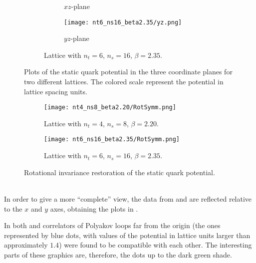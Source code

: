 \begin{figure}[!htbp]
\begin{subfigure}[b]{\textwidth}
\begin{subfigure}[b]{0.32\textwidth}
            \caption{$xz$-plane}
            \label{4F:PotentialPlanes616xz}
        \end{subfigure}
        \hfill
        \begin{subfigure}[b]{0.32\textwidth}
            \addtocounter{subfigure}{-1}
            \renewcommand\thesubfigure{\alph{subfigure}3}
            \texttt{[image: nt6\_ns16\_beta2.35/yz.png]}
            \caption{$yz$-plane}
            \label{4F:PotentialPlanes616yz}
        \end{subfigure}
        \addtocounter{subfigure}{-1}
        \caption{Lattice with $n_t=6$, $n_s=16$, $\beta=2.35$.}
        \label{4F:PotentialPlanes616}
    \end{subfigure}
    \caption{Plots of the static quark potential in the three coordinate planes for two different lattices. The colored scale represent the potential in lattice spacing units.}
    \label{4F:PotentialPlanes}
\end{figure}
\begin{figure}[!htbp]
    \centering
    \begin{subfigure}[b]{0.48\textwidth}
        \texttt{[image: nt4\_ns8\_beta2.20/RotSymm.png]}
        \caption{Lattice with $n_t=4$, $n_s=8$, $\beta=2.20$.}
        \label{4F:PotentialRestorationLargea}
    \end{subfigure}
    \begin{subfigure}[b]{0.48\textwidth}
        \texttt{[image: nt6\_ns16\_beta2.35/RotSymm.png]}
        \caption{Lattice with $n_t=6$, $n_s=16$, $\beta=2.35$.}
        \label{4F:PotentialRestorationSmalla}
    \end{subfigure}
    \caption{Rotational invariance restoration of the static quark potential.}
    \label{4F:PotentialRestoration}
\end{figure}\\
In order to give a more ``complete'' view, the data from  and  are reflected relative to the $x$ and $y$ axes, obtaining the plots in .

In both  and  correlators of Polyakov loops far from the origin (the ones represented by blue dots, with values of the potential in lattice units larger than approximately $1.4$) were found to be compatible with each other.
The interesting parts of these graphics are, therefore, the dots up to the dark green shade.

